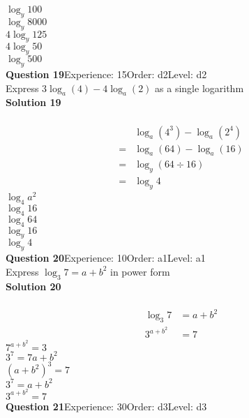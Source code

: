 \documentclass{article}
\begin{document}
$\log_{y}100$\\
$\log_{y}8000$\\
$4\log_{y}125$\\
$4\log_{y}50$\\
$\log_{y}500$\\
\noindent\textbf{Question 19}\hspace{20pt}Experience: 15\hspace{20pt}Order: d2\hspace{20pt}Level: d2\\[2pt]
Express $3\log_{a}(4)-4\log_{a}(2)$ as a single logarithm\\[4pt]
\noindent\textbf{Solution 19}\\[2pt]
\\[-10pt]\begin{align*}
&\log_{a}(4^3)-\log_{a}(2^4)\\[2pt]
=&\log_{a}(64)-\log_{a}(16)\\[2pt]
=&\log_{y}(64 \div 16)\\[2pt]
=&\log_{y}4
\end{align*}
$\log_{4}a^2$\\
$\log_{4}16$\\
$\log_{4}64$\\
$\log_{y}16$\\
$\log_{y}4$\\
\noindent\textbf{Question 20}\hspace{20pt}Experience: 10\hspace{20pt}Order: a1\hspace{20pt}Level: a1\\[2pt]
Express $\log_{3}7=a+b^2$ in power form\\[4pt]
\noindent\textbf{Solution 20}\\[2pt]
\\[-10pt]\begin{align*}
\log_{3}7&=a+b^2\\[2pt]
3^{a+b^2}&=7
\end{align*}
$7^{a+b^2}=3$\\
$3^7=7a+b^2$\\
$(a+b^2)^3=7$\\
$3^{7}=a+b^2$\\
$3^{a+b^2}=7$\\
\noindent\textbf{Question 21}\hspace{20pt}Experience: 30\hspace{20pt}Order: d3\hspace{20pt}Level: d3\\[2pt]
\end{document}
